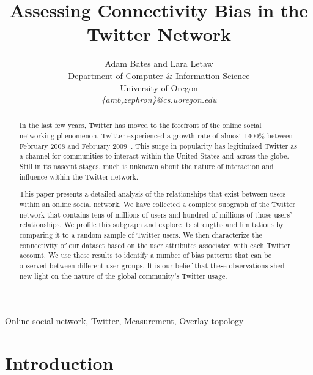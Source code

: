 \documentclass[10pt,twocolumn]{IEEEtran11}
\begin{document}


\title{\Large \bf Assessing Connectivity Bias in the Twitter Network
}

\author{Adam Bates and Lara Letaw\\
Department of Computer \& Information Science\\
University of Oregon\\
\textit{\{amb,zephron\}@cs.uoregon.edu}}

\maketitle %
\begin{abstract} 
In the last few years, Twitter has moved to the forefront of 
the online social networking phenomenon.  Twitter experienced a growth rate of almost 1400\% between February 2008 and February 
2009~\cite{lrossi:mcgiboney_twitters_2009}.  This surge in popularity has legitimized Twitter as a channel for communities to interact within the United States and 
across the globe.  Still in its nascent stages, much is unknown about the nature of interaction and influence within the Twitter network.

This paper 
presents a detailed analysis of the relationships that exist between users within an online social network.  We have collected a complete subgraph of the 
Twitter network that contains tens of millions of users and hundred of millions of those users' relationships.  We profile this subgraph and explore its strengths and 
limitations by comparing it to a random sample of Twitter users.  We then characterize the connectivity of our dataset based on the user attributes associated with each 
Twitter account.  We use these results to identify a number of bias patterns that can be observed between different user groups.  It is our belief that these 
observations shed new light on the nature of the global community's Twitter usage.\\ 
\end{abstract}

\begin{keywords} Online social network, Twitter, Measurement, Overlay topology \end{keywords}

\section{Introduction}
\label{sec:introduction}

\end{document}
